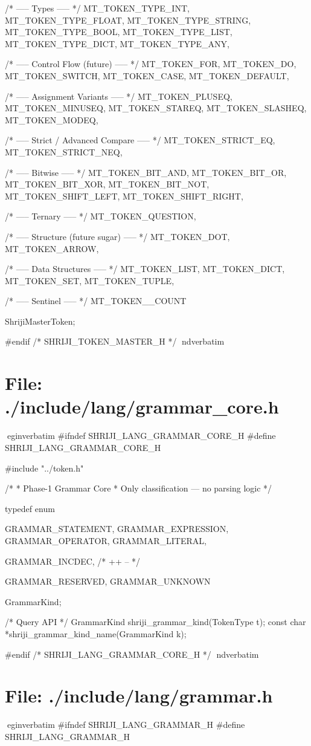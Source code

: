 \documentclass{article}
\begin{document}
{    /* ----- Types ----- */
    MT_TOKEN_TYPE_INT,
    MT_TOKEN_TYPE_FLOAT,
    MT_TOKEN_TYPE_STRING,
    MT_TOKEN_TYPE_BOOL,
    MT_TOKEN_TYPE_LIST,
    MT_TOKEN_TYPE_DICT,
    MT_TOKEN_TYPE_ANY,

    /* ----- Control Flow (future) ----- */
    MT_TOKEN_FOR,
    MT_TOKEN_DO,
    MT_TOKEN_SWITCH,
    MT_TOKEN_CASE,
    MT_TOKEN_DEFAULT,

    /* ----- Assignment Variants ----- */
    MT_TOKEN_PLUSEQ,
    MT_TOKEN_MINUSEQ,
    MT_TOKEN_STAREQ,
    MT_TOKEN_SLASHEQ,
    MT_TOKEN_MODEQ,

    /* ----- Strict / Advanced Compare ----- */
    MT_TOKEN_STRICT_EQ,
    MT_TOKEN_STRICT_NEQ,

    /* ----- Bitwise ----- */
    MT_TOKEN_BIT_AND,
    MT_TOKEN_BIT_OR,
    MT_TOKEN_BIT_XOR,
    MT_TOKEN_BIT_NOT,
    MT_TOKEN_SHIFT_LEFT,
    MT_TOKEN_SHIFT_RIGHT,

    /* ----- Ternary ----- */
    MT_TOKEN_QUESTION,

    /* ----- Structure (future sugar) ----- */
    MT_TOKEN_DOT,
    MT_TOKEN_ARROW,

    /* ----- Data Structures ----- */
    MT_TOKEN_LIST,
    MT_TOKEN_DICT,
    MT_TOKEN_SET,
    MT_TOKEN_TUPLE,

    /* ----- Sentinel ----- */
    MT_TOKEN__COUNT

} ShrijiMasterToken;

#endif /* SHRIJI_TOKEN_MASTER_H */
nd{verbatim}
\section*{File: ./include/lang/grammar_core.h}
egin{verbatim}
#ifndef SHRIJI_LANG_GRAMMAR_CORE_H
#define SHRIJI_LANG_GRAMMAR_CORE_H

#include "../token.h"

/*
 * Phase-1 Grammar Core
 * Only classification — no parsing logic
 */

typedef enum {
    GRAMMAR_STATEMENT,
    GRAMMAR_EXPRESSION,
    GRAMMAR_OPERATOR,
    GRAMMAR_LITERAL,

    GRAMMAR_INCDEC,     /* ++ -- */

    GRAMMAR_RESERVED,
    GRAMMAR_UNKNOWN
} GrammarKind;

/* Query API */
GrammarKind shriji_grammar_kind(TokenType t);
const char *shriji_grammar_kind_name(GrammarKind k);

#endif /* SHRIJI_LANG_GRAMMAR_CORE_H */
nd{verbatim}
\section*{File: ./include/lang/grammar.h}
egin{verbatim}
#ifndef SHRIJI_LANG_GRAMMAR_H
#define SHRIJI_LANG_GRAMMAR_H
\end{document}
